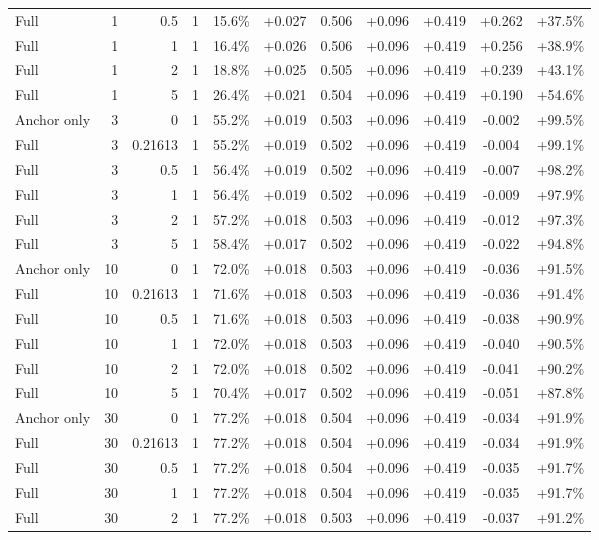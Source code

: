 \begin{table}[htbp]
\begin{tabular}{lrrrccccccc}
Full & 1 & 0.5 & 1 & 15.6\% & +0.027 & 0.506 & +0.096 & +0.419 & +0.262 & +37.5\% \\
Full & 1 & 1 & 1 & 16.4\% & +0.026 & 0.506 & +0.096 & +0.419 & +0.256 & +38.9\% \\
Full & 1 & 2 & 1 & 18.8\% & +0.025 & 0.505 & +0.096 & +0.419 & +0.239 & +43.1\% \\
Full & 1 & 5 & 1 & 26.4\% & +0.021 & 0.504 & +0.096 & +0.419 & +0.190 & +54.6\% \\
Anchor only & 3 & 0 & 1 & 55.2\% & +0.019 & 0.503 & +0.096 & +0.419 & -0.002 & +99.5\% \\
Full & 3 & 0.21613 & 1 & 55.2\% & +0.019 & 0.502 & +0.096 & +0.419 & -0.004 & +99.1\% \\
Full & 3 & 0.5 & 1 & 56.4\% & +0.019 & 0.502 & +0.096 & +0.419 & -0.007 & +98.2\% \\
Full & 3 & 1 & 1 & 56.4\% & +0.019 & 0.502 & +0.096 & +0.419 & -0.009 & +97.9\% \\
Full & 3 & 2 & 1 & 57.2\% & +0.018 & 0.503 & +0.096 & +0.419 & -0.012 & +97.3\% \\
Full & 3 & 5 & 1 & 58.4\% & +0.017 & 0.502 & +0.096 & +0.419 & -0.022 & +94.8\% \\
Anchor only & 10 & 0 & 1 & 72.0\% & +0.018 & 0.503 & +0.096 & +0.419 & -0.036 & +91.5\% \\
Full & 10 & 0.21613 & 1 & 71.6\% & +0.018 & 0.503 & +0.096 & +0.419 & -0.036 & +91.4\% \\
Full & 10 & 0.5 & 1 & 71.6\% & +0.018 & 0.503 & +0.096 & +0.419 & -0.038 & +90.9\% \\
Full & 10 & 1 & 1 & 72.0\% & +0.018 & 0.503 & +0.096 & +0.419 & -0.040 & +90.5\% \\
Full & 10 & 2 & 1 & 72.0\% & +0.018 & 0.502 & +0.096 & +0.419 & -0.041 & +90.2\% \\
Full & 10 & 5 & 1 & 70.4\% & +0.017 & 0.502 & +0.096 & +0.419 & -0.051 & +87.8\% \\
Anchor only & 30 & 0 & 1 & 77.2\% & +0.018 & 0.504 & +0.096 & +0.419 & -0.034 & +91.9\% \\
Full & 30 & 0.21613 & 1 & 77.2\% & +0.018 & 0.504 & +0.096 & +0.419 & -0.034 & +91.9\% \\
Full & 30 & 0.5 & 1 & 77.2\% & +0.018 & 0.504 & +0.096 & +0.419 & -0.035 & +91.7\% \\
Full & 30 & 1 & 1 & 77.2\% & +0.018 & 0.504 & +0.096 & +0.419 & -0.035 & +91.7\% \\
Full & 30 & 2 & 1 & 77.2\% & +0.018 & 0.503 & +0.096 & +0.419 & -0.037 & +91.2\% \\

\end{tabular}
\end{table}
